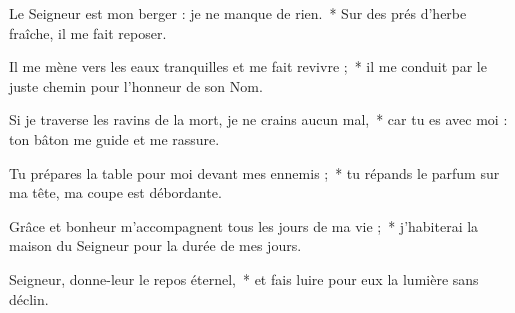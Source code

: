 \item Le Seigneur est mon berger : je ne manque de rien.~* Sur des prés d'herbe fraîche, il me fait reposer.

\item Il me mène vers les eaux tranquilles et me fait revivre ;~* il me conduit par le juste chemin pour l'honneur de son Nom.

\item Si je traverse les ravins de la mort, je ne crains aucun mal,~* car tu es avec moi : ton bâton me guide et me rassure.

\item Tu prépares la table pour moi devant mes ennemis ;~* tu répands le parfum sur ma tête, ma coupe est débordante.

\item Grâce et bonheur m'accompagnent tous les jours de ma vie ;~* j'habiterai la maison du Seigneur pour la durée de mes jours.

\item Seigneur, donne-leur le repos éternel,~* et fais luire pour eux la lumière sans déclin.